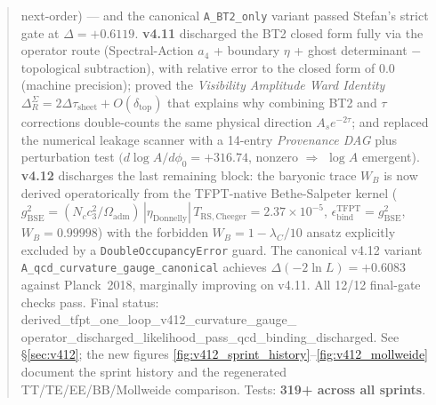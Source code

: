 \documentclass[11pt,a4paper]{article}
\begin{document}
\begin{abstract}
next-order) --- and the canonical \texttt{A\_BT2\_only} variant
passed Stefan's strict gate at \(\Delta=+0.6119\).
\textbf{v4.11} discharged the BT2 closed form fully via the
operator route (Spectral-Action $a_4$ + boundary $\eta$ + ghost
determinant \(-\) topological subtraction), with relative error to
the closed form of \(0.0\) (machine precision); proved the
\emph{Visibility Amplitude Ward Identity}
\(\Delta_R^\Sigma=2\Delta\tau_{\mathrm{sheet}}+O(\delta_{\mathrm{top}})\)
that explains why combining BT2 and \(\tau\) corrections
double-counts the same physical direction \(A_s e^{-2\tau}\); and
replaced the numerical leakage scanner with a 14-entry
\emph{Provenance DAG} plus perturbation test
\((d\log A/d\phi_0=+316.74\), nonzero \(\Rightarrow\) \(\log A\)
emergent).
\textbf{v4.12} discharges the last remaining block: the baryonic
trace \(W_B\) is now derived operatorically from the TFPT-native
Bethe-Salpeter kernel
(\(g_{\mathrm{BSE}}^2=(N_c c_3^2/\Omega_{\mathrm{adm}})\,
|\eta_{\mathrm{Donnelly}}|\,T_{\mathrm{RS,Cheeger}}=2.37\times 10^{-5}\),
\(\epsilon_{\mathrm{bind}}^{\mathrm{TFPT}}=g_{\mathrm{BSE}}^2\),
\(W_B=0.99998\)) with the forbidden \(W_B=1-\lambda_C/10\) ansatz
explicitly excluded by a \texttt{DoubleOccupancyError} guard.
The canonical v4.12 variant
\texttt{A\_qcd\_curvature\_gauge\_canonical} achieves
\(\Delta(-2\ln L)=+0.6083\) against Planck~2018, marginally
improving on v4.11.  All 12/12 final-gate checks pass.  Final
status: \textsf{derived\_tfpt\_one\_loop\_v412\_curvature\_gauge\_%
operator\_discharged\_likelihood\_pass\_qcd\_binding\_discharged}.
See \S\ref{sec:v412}; the new figures
\ref{fig:v412_sprint_history}--\ref{fig:v412_mollweide} document
the sprint history and the regenerated TT/TE/EE/BB/Mollweide
comparison.  Tests: \textbf{319+ across all sprints}.
\end{abstract}
\end{document}
